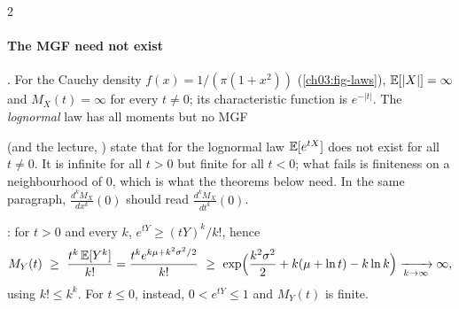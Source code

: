 \begin{paracol}{2}
\paragraph{The MGF need not exist} . For the Cauchy density $f(x)=1/(\pi(1+x^2))$ (\cref{ch03:fig-laws}), $\mathbb{E}[|X|]=\infty$
and $M_X(t)=\infty$ for every $t\ne0$; its characteristic function is $e^{-|t|}$. The \emph{lognormal} law has
all moments but no MGF \begin{coursenote}
 (and the lecture, ) state that for the lognormal law $\mathbb{E}[e^{tX}]$ does not
exist for all $t\neq0$. It is infinite for all $t>0$ but finite for all $t<0$; what fails is finiteness on a
neighbourhood of $0$, which is what the theorems below need. In the same paragraph,
$\frac{d^kM_X}{dx^k}(0)$ should read $\frac{d^kM_X}{dt^k}(0)$.
\end{coursenote}: for $t>0$ and every $k$, $e^{tY}\ge(tY)^k/k!$, hence
\[
  M_Y(t)\ \ge\ \frac{t^k\,\E[Y^k]}{k!}=\frac{t^k e^{k\mu+k^2\sigma^2/2}}{k!}\ \ge\ \exp\Bigl(\frac{k^2\sigma^2}{2}+k(\mu+\ln t)-k\ln k\Bigr)\xrightarrow[k\to\infty]{}\infty ,
\]
using $k!\le k^k$. For $t\le0$, instead, $0<e^{tY}\le1$ and $M_Y(t)$ is finite.


\end{paracol}
